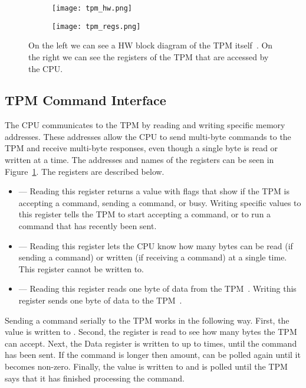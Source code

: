 \begin{figure}
  \centering
\begin{subfigure}{.4\textwidth}
  \centering
  \texttt{[image: tpm\_hw.png]}
\end{subfigure}
\begin{subfigure}{.40\textwidth}
  \centering
  \texttt{[image: tpm\_regs.png]}
\end{subfigure}
\caption[TPM Hardware Diagram]{On the left we can see a HW block diagram of the TPM
itself~\cite{tpm-slides}. 
On the right we can see the registers of the TPM that are accessed by the CPU.}
\label{fig:tpm_hw}
\end{figure}


\subsection{TPM Command Interface}\label{tpm_cmd_regs}

The CPU communicates to the TPM by reading and writing specific memory addresses.
These addresses allow the CPU to send multi-byte commands to the TPM and receive multi-byte responses, even though a single byte is read or written at a time.
The addresses and names of the registers can be seen in Figure~\ref{fig:tpm_hw}.
The registers are described below.

\begin{itemize}
    \item {} --- Reading this register returns a value with flags
        that show if the TPM is accepting a command, sending a command, or
        busy. Writing specific values to this register tells the TPM to start
        accepting a command, or to run a command that has recently been sent.
    \item {} --- Reading this register lets the CPU know how many
        bytes can be read (if sending a command) or written (if receiving a
        command) at a single time. This register cannot be written to.
    \item {} --- Reading this register reads one byte of data from the TPM~. Writing this register sends one byte of data to the TPM~.
\end{itemize}

Sending a command serially to the TPM works in the following way.
First, the  value is written to .
Second, the  register is read to see how many bytes the TPM can accept.
Next, the Data register is written to up to  times, until the command has been sent.
If the command is longer then  amount,  can be polled again until it becomes non-zero.
Finally, the  value is written to  and  is polled until the TPM says that it has finished processing the command.

